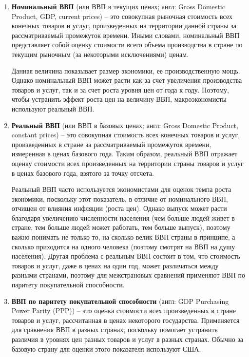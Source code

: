 \documentclass[12pt,a4paper]{article}
\begin{document}
\begin{enumerate}

\item \textbf{Номинальный ВВП} (или ВВП в текущих ценах; англ: Gross Domestic Product, GDP, current prices) – это совокупная рыночная стоимость всех конечных товаров и услуг, произведенных на территории данной страны за рассматриваемый промежуток времени. Иными словами, номинальный ВВП представляет собой оценку стоимости всего объема производства в стране по текущим рыночным (за некоторыми исключениями) ценам.

Данная величина показывает размер экономики, ее производственную мощь. Однако номинальный ВВП может расти как за счет увеличения производства товаров и услуг, так и за счет роста уровня цен от года к году. Поэтому, чтобы устранить эффект роста цен на величину ВВП, макроэкономисты используют реальный ВВП.

\item \textbf{Реальный ВВП} (или ВВП в базовых ценах; англ: Gross Domestic Product, constant prices) – это совокупная стоимость всех конечных товаров и услуг, произведенных в стране за рассматриваемый промежуток времени, измеренная в ценах базового года. Таким образом, реальный ВВП отражает оценку стоимости всех произведенных на территории страны товаров и услуг в ценах базового года, взятого за точку отсчета.

Реальный ВВП часто используется экономистами для оценок темпа роста экономики, поскольку этот показатель, в отличие от номинального ВВП, отчищен от влияния инфляции (роста цен). Однако выпуск может расти благодаря увеличению численности населения (чем больше людей живет в стране, тем больше людей может работать, тем больше выпуск), поэтому важно понимать не только то, на сколько велик ВВП страны в принципе, а сколько приходится на одного человека (поэтому смотрят на ВВП на душу населения). Другая проблема с реальным ВВП состоит в том, что стоимость товаров и услуг, даже в ценах на один год, может различаться между разными странами, поэтому для межстрановых сравнений применяют ВВП по паритету покупательной способности.

\item \textbf{ВВП по паритету покупательной способности} (англ: GDP Purchasing Power Parity (PPP)) – это оценка стоимости всех произведенных в стране товаров и услуг, рассчитанная в ценах некоторого государства. Применяется для сравнения ВВП в разных странах, поскольку помогает устранить различия в уровнях цен разных товаров и услуг в разных странах. Обычно за базовую страну для оценки этого показателя используют США.


\end{enumerate}
\end{document}
